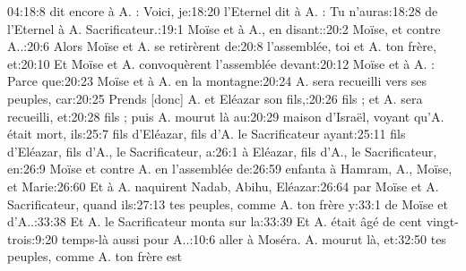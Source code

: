 \begin{multicols}{3}
{04:18:8	dit encore à A. : Voici, je:18:20	l'Eternel dit à A. : Tu n'auras:18:28	de l'Eternel à A. Sacrificateur.:19:1	Moïse et à A., en disant::20:2	Moïse, et contre A..:20:6	Alors Moïse et A. se retirèrent de:20:8	l'assemblée, toi et A. ton frère, et:20:10	Et Moïse et A. convoquèrent l'assemblée devant:20:12	Moïse et à A. : Parce que:20:23	Moïse et à A. en la montagne:20:24	A. sera recueilli vers ses peuples, car:20:25	Prends [donc] A. et Eléazar son fils,:20:26	fils ; et A. sera recueilli, et:20:28	fils ; puis A. mourut là au:20:29	maison d'Israël, voyant qu'A. était mort, ils:25:7	fils d'Eléazar, fils d'A. le Sacrificateur ayant:25:11	fils d'Eléazar, fils d'A., le Sacrificateur, a:26:1	à Eléazar, fils d'A., le Sacrificateur, en:26:9	Moïse et contre A. en l'assemblée de:26:59	enfanta à Hamram, A., Moïse, et Marie:26:60	Et à A. naquirent Nadab, Abihu, Eléazar:26:64	par Moïse et A. Sacrificateur, quand ils:27:13	tes peuples, comme A. ton frère y:33:1	de Moïse et d'A..:33:38	Et A. le Sacrificateur monta sur la:33:39	Et A. était âgé de cent vingt-trois:9:20	temps-là aussi pour A..:10:6	aller à Moséra. A. mourut là, et:32:50	tes peuples, comme A. ton frère est\newline
}
\end{multicols}
